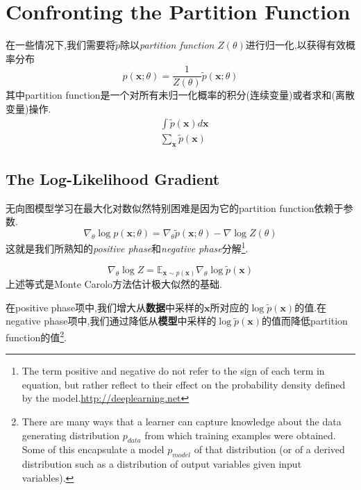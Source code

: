 \chapter{Confronting the Partition Function}

在一些情况下,我们需要将$\tilde p$除以\textit{partition function} $Z(\theta)$进行归一化,以获得有效概率分布
\begin{equation}
p(\mathbf x;\theta)=\frac{1}{Z(\theta)}\tilde p(\mathbf x;\theta)
\end{equation}
其中partition function是一个对所有未归一化概率的积分(连续变量)或者求和(离散变量)操作.
\begin{equation}\begin{split}
&\int\tilde p(\mathbf x)d\mathbf x\\
&\sum_{\mathbf x}\tilde p(\mathbf x)
\end{split}\end{equation}

\section{The Log-Likelihood Gradient}

无向图模型学习在最大化对数似然特别困难是因为它的partition function依赖于参数.
\begin{equation}
\nabla_\theta\log p(\mathbf x;\theta)=\nabla_\theta\tilde p(\mathbf x;\theta)-\nabla\log Z(\theta)
\end{equation}
这就是我们所熟知的\textit{positive phase}和\textit{negative phase}分解\footnote{The term positive and negative do not refer to the sign of each term in equation, but rather reflect to their effect on the probability density defined by the model.\href{http://deeplearning.net/tutorial/rbm.html\#rbm}{http://deeplearning.net}}.

\begin{equation}
\nabla_\theta\log Z=\mathbb E_{\mathbf x\sim p(\mathbf x)}\nabla_\theta\log\tilde p(\mathbf x)
\end{equation}
上述等式是Monte Carolo方法估计极大似然的基础.

在positive phase项中,我们增大从\textbf{数据}中采样的$\mathbf x$所对应的$\log\tilde p(\mathbf x)$的值.在negative phase项中,我们通过降低从\textbf{模型}中采样的$\log\tilde p(\mathbf x)$的值而降低partition function的值\footnote{There are many ways that a learner can capture knowledge about the data generating distribution $p_{data}$ from which training examples were obtained. Some of this encapsulate a model $p_{model}$ of that distribution (or of a derived distribution such as a distribution of output variables given input variables).}.